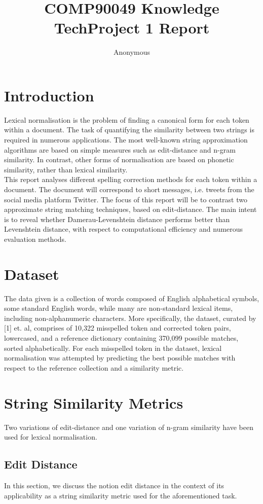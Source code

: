 \documentclass[11pt]{article}
\title{COMP90049 Knowledge TechProject 1 Report}
\author{Anonymous}
\begin{document}
\maketitle


\section{Introduction}
Lexical normalisation is the problem of finding a canonical form for each token within a document. The task of quantifying the similarity between two strings is required in numerous applications. The most well-known string approximation algorithms are based on simple measures such as edit-distance and n-gram similarity. In contrast, other forms of normalisation are based on phonetic similarity, rather than lexical similarity.
\\

This report analyses different spelling correction methods for each token within a document. The document will correspond to short messages, i.e. tweets from the social media platform Twitter. The focus of this report will be to contrast two approximate string matching techniques, based on edit-distance. The main intent is to reveal whether Damerau-Levenshtein distance performs better than Levenshtein distance, with respect to computational efficiency and numerous evaluation methods.

\section{Dataset}
The data given is a collection of words composed of English alphabetical symbols, some standard English words, while many are non-standard lexical items, including non-alphanumeric characters.
More specifically, the dataset, curated by [1] et. al, comprises of 10,322 misspelled token and corrected token pairs, lowercased, and a reference dictionary containing 370,099 possible matches, sorted alphabetically. For each misspelled token in the dataset, lexical normalisation was attempted by predicting the best possible matches with respect to the reference collection and a similarity metric.

\section{String Similarity Metrics}
Two variations of edit-distance and one variation of n-gram similarity have been used for lexical normalisation.
\subsection{Edit Distance}
In this section, we discuss the notion edit distance in the context of its applicability as a string similarity metric used for the aforementioned task. 
\end{document}
